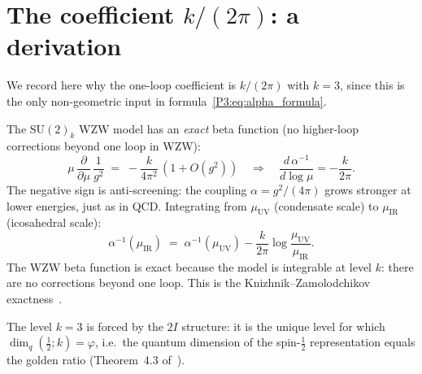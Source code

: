 \documentclass[11pt,a4paper]{article}
\theoremstyle{definition}
\theoremstyle{remark}
\newcommand{\vp}{\varphi}
\newcommand{\aInv}{\alpha^{-1}}
\begin{document}
\section{The coefficient $k/(2\pi)$: a derivation}
\label{P3:sec:coeff}

We record here why the one-loop coefficient is $k/(2\pi)$ with $k=3$,
since this is the only non-geometric input in formula~\eqref{P3:eq:alpha_formula}.

The $\mathrm{SU}(2)_k$ WZW model has an \emph{exact} beta function
(no higher-loop corrections beyond one loop in WZW):
\begin{equation}
  \mu\,\frac{\partial}{\partial\mu}\,\frac{1}{g^2}
  \;=\; -\frac{k}{4\pi^2}\,(1 + O(g^2))
  \quad\Longrightarrow\quad
  \frac{d\,\aInv}{d\log\mu} = -\frac{k}{2\pi}.
  \label{P3:eq:beta_wzw}
\end{equation}
The negative sign is anti-screening: the coupling $\alpha = g^2/(4\pi)$
grows stronger at lower energies, just as in QCD.
Integrating from $\mu_{\mathrm{UV}}$ (condensate scale) to
$\mu_{\mathrm{IR}}$ (icosahedral scale):
\begin{equation}
  \aInv(\mu_{\mathrm{IR}})
  \;=\; \aInv(\mu_{\mathrm{UV}})
        - \frac{k}{2\pi}\log\frac{\mu_{\mathrm{UV}}}{\mu_{\mathrm{IR}}}.
  \label{P3:eq:running_integral}
\end{equation}
The WZW beta function is exact because the model is integrable at
level $k$: there are no corrections beyond one loop.
This is the Knizhnik--Zamolodchikov exactness~\cite{KZ1984}.

The level $k=3$ is forced by the $2I$ structure: it is the unique
level for which $\dim_q(\tfrac{1}{2};k) = \vp$, i.e.\ the quantum
dimension of the spin-$\tfrac{1}{2}$ representation equals the golden
ratio (Theorem~4.3 of~\cite{Paper1}).
\end{document}
